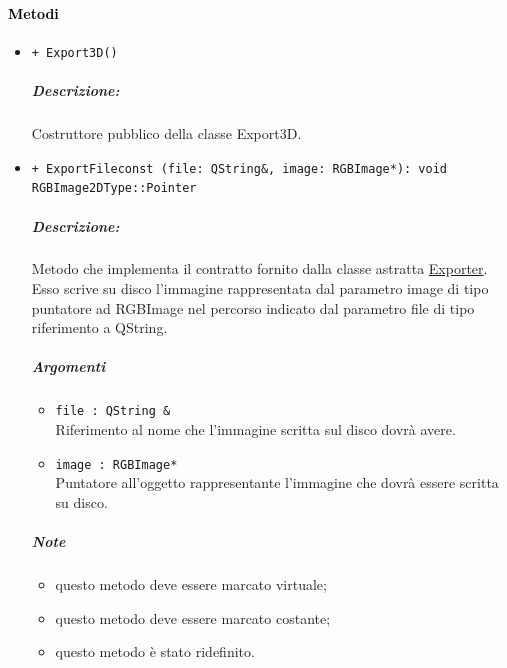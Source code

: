 \paragraph{\textcolor{black}{Metodi}}
	\begin{itemize}
		\item \color{blue}\verb!+ Export3D()!
		\color{black}
		\subparagraph{Descrizione:} Costruttore pubblico della classe Export3D.


		\item\color{blue}\verb!+ ExportFileconst (file: QString&, image: RGBImage*): void RGBImage2DType::Pointer!
		\color{black}
		\subparagraph{Descrizione:} Metodo che implementa il contratto fornito dalla classe astratta \hyperref[spexporter]{Exporter}. Esso scrive su disco l'immagine rappresentata dal parametro image di tipo puntatore ad RGBImage nel percorso indicato dal parametro file di tipo riferimento a QString.

		\subparagraph{Argomenti}
			\begin{itemize}
				\item \color{RoyalPurple}\verb!file : QString &! \\ 
				\color{black}Riferimento al nome che l'immagine scritta sul disco dovrà avere.
				\item \color{RoyalPurple}\verb!image : RGBImage*! \\ 
				\color{black}Puntatore all'oggetto rappresentante l'immagine che dovrà essere scritta su disco.
			\end{itemize}
\color{black}
		\subparagraph{Note}
			\begin{itemize}
				\item questo metodo deve essere marcato virtuale;
				\item questo metodo deve essere marcato costante;
				\item questo metodo è stato ridefinito.
			\end{itemize} 
	\end{itemize}
\color{black}
